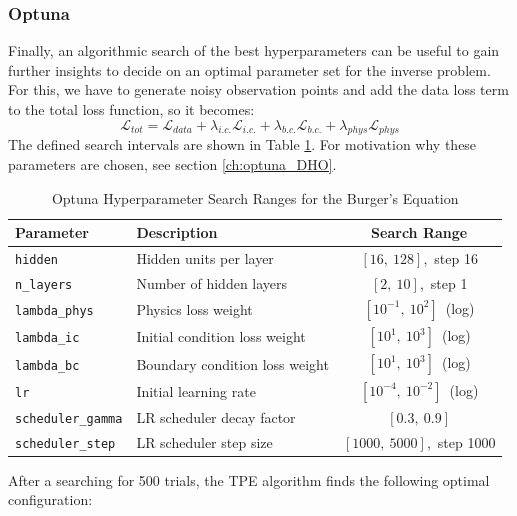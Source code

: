 \documentclass[we,twoside,openright,a4paper,11pt]{uantwerpenbamathesis}
\begin{document}
\subsubsection{Optuna}
Finally, an algorithmic search of the best hyperparameters can be useful to gain further insights to decide on an optimal parameter set for the inverse problem. For this, we have to generate noisy observation points and add the data loss term to the total loss function, so it becomes:
\begin{equation}\label{eq:loss_BE}
    \mathcal{L}_{tot} = \mathcal{L}_{data}+\lambda_{i.c.}\mathcal{L}_{i.c.} + \lambda_{b.c.}\mathcal{L}_{b.c.} + \lambda_{phys}\mathcal{L}_{phys}
\end{equation}
The defined search intervals are shown in Table \ref{tab:optuna_hyperparams_BE}. For motivation why these parameters are chosen, see section \ref{ch:optuna_DHO}.
\begin{table}[H]
\centering
\caption{Optuna Hyperparameter Search Ranges for the Burger's Equation}\label{tab:optuna_hyperparams_BE}
\begin{tabular}{llc}
\toprule
\textbf{Parameter} & \textbf{Description} & \textbf{Search Range} \\
\midrule
\texttt{hidden}           & Hidden units per layer         & $[16,\ 128]$,\ step 16 \\
\texttt{n\_layers}        & Number of hidden layers        & $[2,\ 10]$,\ step 1 \\
\texttt{lambda\_phys}     & Physics loss weight            & $[10^{-1},\ 10^{2}]$\ (log) \\
\texttt{lambda\_ic}       & Initial condition loss weight  & $[10^{1},\ 10^{3}]$\ (log) \\
\texttt{lambda\_bc}       & Boundary condition loss weight & $[10^{1},\ 10^{3}]$\ (log) \\
\texttt{lr}               & Initial learning rate          & $[10^{-4},\ 10^{-2}]$\ (log) \\
\texttt{scheduler\_gamma} & LR scheduler decay factor      & $[0.3,\ 0.9]$ \\
\texttt{scheduler\_step}  & LR scheduler step size         & $[1000,\ 5000]$,\ step 1000 \\
\bottomrule
\end{tabular}
\end{table}
After a searching for 500 trials, the TPE algorithm finds the following optimal configuration:
\end{document}
